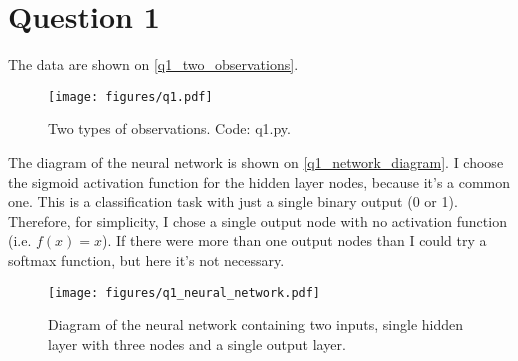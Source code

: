 \section{Question 1}

The data are shown on \autoref{q1_two_observations}.

\begin{figure}[!ht]
  \centering
  \texttt{[image: figures/q1.pdf]}
  \caption{Two types of observations. Code: q1.py.}
  \label{q1_two_observations}
\end{figure}

The diagram of the neural network is shown on \autoref{q1_network_diagram}. I choose the sigmoid activation function for the hidden layer nodes, because it's a common one. This is a classification task with just a single binary output (0 or 1). Therefore, for simplicity, I chose a single output node with no activation function (i.e. $f(x) = x$). If there were more than one output nodes than I could try a softmax function, but here it's not necessary.

\begin{figure}[!ht]
  \centering
  \texttt{[image: figures/q1\_neural\_network.pdf]}
  \caption{Diagram of the neural network containing two inputs, single hidden layer with three nodes and a single output layer.}
  \label{q1_network_diagram}
\end{figure}


